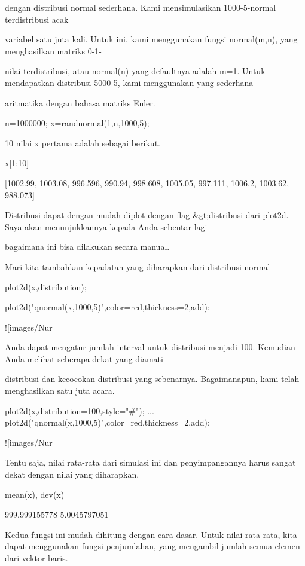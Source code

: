 \documentclass{article}
\begin{document}
  dengan distribusi normal sederhana. Kami mensimulasikan
1000-5-normal terdistribusi acak


variabel satu juta kali. Untuk ini, kami menggunakan fungsi
normal(m,n), yang menghasilkan matriks 0-1-


nilai terdistribusi, atau normal(n) yang defaultnya adalah m=1. Untuk
mendapatkan distribusi 5000-5, kami menggunakan yang sederhana


aritmatika dengan bahasa matriks Euler.


\>n=1000000; x=randnormal(1,n,1000,5);


10 nilai x pertama adalah sebagai berikut.


\>x[1:10]


    [1002.99,  1003.08,  996.596,  990.94,  998.608,  1005.05,  997.111,
    1006.2,  1003.62,  988.073]

Distribusi dapat dengan mudah diplot dengan flag &gt;distribusi dari
plot2d. Saya akan menunjukkannya kepada Anda sebentar lagi


bagaimana ini bisa dilakukan secara manual.


Mari kita tambahkan kepadatan yang diharapkan dari distribusi normal


\>plot2d(x,\>distribution);

\>plot2d("qnormal(x,1000,5)",color=red,thickness=2,\>add):


![images/Nur%

Anda dapat mengatur jumlah interval untuk distribusi menjadi 100.
Kemudian Anda melihat seberapa dekat yang diamati


distribusi dan kecocokan distribusi yang sebenarnya. Bagaimanapun,
kami telah menghasilkan satu juta acara.


\>plot2d(x,distribution=100,style="#"); ...  
\>   plot2d("qnormal(x,1000,5)",color=red,thickness=2,\>add):


![images/Nur%

Tentu saja, nilai rata-rata dari simulasi ini dan penyimpangannya
harus sangat dekat dengan nilai yang diharapkan.


\>mean(x), dev(x)


    999.999155778
    5.0045797051

Kedua fungsi ini mudah dihitung dengan cara dasar. Untuk nilai
rata-rata, kita dapat menggunakan fungsi penjumlahan, yang mengambil
jumlah semua elemen dari vektor baris.
\end{document}
